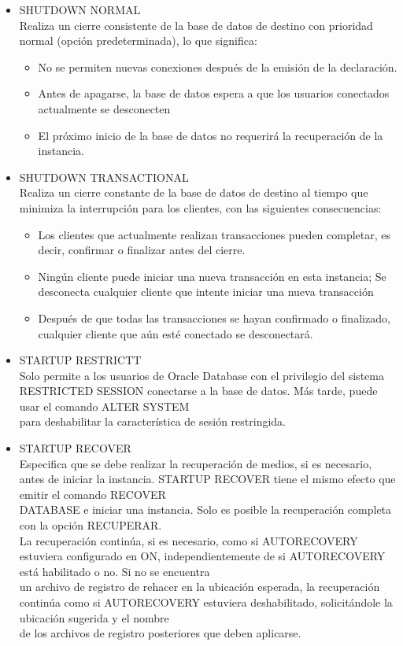 \begin{itemize}
\item SHUTDOWN NORMAL
	\\Realiza un cierre consistente de la base de datos de destino con prioridad normal (opción predeterminada), lo que significa:
		
		\begin{itemize}
			\item No se permiten nuevas conexiones después de la emisión de la declaración.
			\item Antes de apagarse, la base de datos espera a que los usuarios conectados actualmente se desconecten
			\item El próximo inicio de la base de datos no requerirá la recuperación de la instancia.
			
		\end{itemize}
\item SHUTDOWN TRANSACTIONAL
	\\Realiza un cierre constante de la base de datos de destino al tiempo que minimiza la interrupción para los clientes, con las siguientes consecuencias:
		
		\begin{itemize}
			\item Los clientes que actualmente realizan transacciones pueden completar, es decir, confirmar o finalizar antes del cierre.
			\item Ningún cliente puede iniciar una nueva transacción en esta instancia; Se desconecta cualquier cliente que intente iniciar una nueva transacción
			\item Después de que todas las transacciones se hayan confirmado o finalizado, cualquier cliente que aún esté conectado se desconectará.		
		\end{itemize}
\item STARTUP RESTRICTT 
	\\Solo permite a los usuarios de Oracle Database con el privilegio del sistema RESTRICTED SESSION conectarse a la base de datos. M\'as tarde, puede usar el comando ALTER SYSTEM 
	\\para deshabilitar la caracter\'istica de sesi\'on restringida.
	\\
\item STARTUP RECOVER 
	\\Especifica que se debe realizar la recuperación de medios, si es necesario, antes de iniciar la instancia. STARTUP RECOVER tiene el mismo efecto que emitir el comando RECOVER
	 \\DATABASE e iniciar una instancia. Solo es posible la recuperaci\'on completa con la opci\'on RECUPERAR.
	\\La recuperaci\'on contin\'ua, si es necesario, como si AUTORECOVERY estuviera configurado en ON, independientemente de si AUTORECOVERY est\'a habilitado o no. Si no se encuentra 
	\\un archivo de registro de rehacer en la ubicaci\'on esperada, la recuperaci\'on contin\'ua como si AUTORECOVERY estuviera deshabilitado, solicit\'andole la ubicaci\'on sugerida y el nombre 
	\\de los archivos de registro posteriores que deben aplicarse.



\end{itemize}
